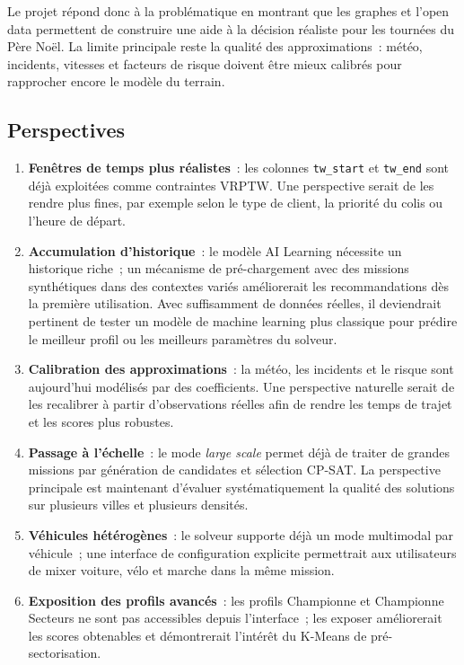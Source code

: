 \documentclass[a4paper, 12pt, twoside]{article}
\begin{document}
Le projet r\'{e}pond donc \`{a} la probl\'{e}matique en montrant que les graphes et l'open data
permettent de construire une aide \`{a} la d\'{e}cision r\'{e}aliste pour les tourn\'{e}es du
P\`{e}re No\"{e}l. La limite principale reste la qualit\'{e} des approximations~: m\'{e}t\'{e}o,
incidents, vitesses et facteurs de risque doivent \^{e}tre mieux calibr\'{e}s pour rapprocher
encore le mod\`{e}le du terrain.

\subsection{Perspectives}

\begin{enumerate}
  \item \textbf{Fen\^{e}tres de temps plus r\'{e}alistes}~: les colonnes \texttt{tw\_start}
        et \texttt{tw\_end} sont d\'{e}j\`{a} exploit\'{e}es comme contraintes VRPTW.
        Une perspective serait de les rendre plus fines, par exemple selon le type
        de client, la priorit\'{e} du colis ou l'heure de d\'{e}part.
  \item \textbf{Accumulation d'historique}~: le mod\`{e}le AI Learning n\'{e}cessite un historique
        riche~; un m\'{e}canisme de pr\'{e}-chargement avec des missions synth\'{e}tiques dans des
        contextes vari\'{e}s am\'{e}liorerait les recommandations d\`{e}s la premi\`{e}re utilisation.
        Avec suffisamment de donn\'{e}es r\'{e}elles, il deviendrait pertinent de tester un
        mod\`{e}le de machine learning plus classique pour pr\'{e}dire le meilleur profil ou
        les meilleurs param\`{e}tres du solveur.
  \item \textbf{Calibration des approximations}~: la m\'{e}t\'{e}o, les incidents et le risque
        sont aujourd'hui mod\'{e}lis\'{e}s par des coefficients. Une perspective naturelle
        serait de les recalibrer \`{a} partir d'observations r\'{e}elles afin de rendre les
        temps de trajet et les scores plus robustes.
  \item \textbf{Passage \`{a} l'\'{e}chelle}~: le mode \textit{large scale} permet d\'{e}j\`{a}
        de traiter de grandes missions par g\'{e}n\'{e}ration de candidates et s\'{e}lection
        CP-SAT. La perspective principale est maintenant d'\'{e}valuer syst\'{e}matiquement
        la qualit\'{e} des solutions sur plusieurs villes et plusieurs densit\'{e}s.
  \item \textbf{V\'{e}hicules h\'{e}t\'{e}rog\`{e}nes}~: le solveur supporte d\'{e}j\`{a} un mode
        multimodal par v\'{e}hicule~; une interface de configuration explicite permettrait
        aux utilisateurs de mixer voiture, v\'{e}lo et marche dans la m\^{e}me mission.
  \item \textbf{Exposition des profils avanc\'{e}s}~: les profils Championne et Championne Secteurs
        ne sont pas accessibles depuis l'interface~; les exposer am\'{e}liorerait les scores
        obtenables et d\'{e}montrerait l'int\'{e}r\^{e}t du K-Means de pr\'{e}-sectorisation.
\end{enumerate}
\end{document}
